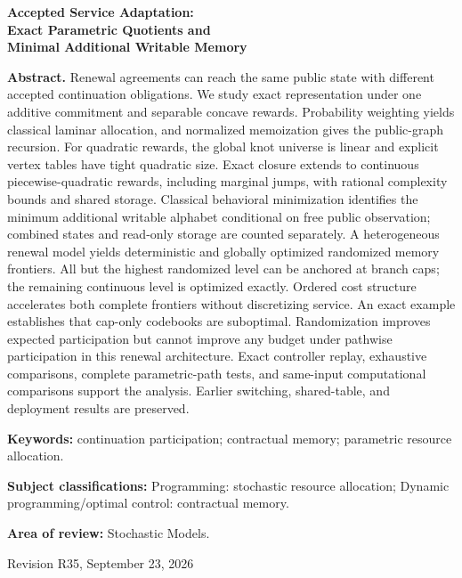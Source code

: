 \documentclass[11pt,letterpaper]{article}
\theoremstyle{definition}\newtheorem{assumption}[theorem]{Assumption}
\begin{document}
\hypersetup{pageanchor=false}
\begin{titlepage}\centering
{\Large\bfseries Accepted Service Adaptation:\\ Exact Parametric Quotients and\\ Minimal Additional Writable Memory\par}
\vspace{.35in}{Anonymous manuscript for Operations Research\par}\vspace{.25in}
\begin{minipage}{\textwidth}
\textbf{Abstract.} Renewal agreements can reach the same public state with different accepted continuation obligations. We study exact representation under one additive commitment and separable concave rewards. Probability weighting yields classical laminar allocation, and normalized memoization gives the public-graph recursion. For quadratic rewards, the global knot universe is linear and explicit vertex tables have tight quadratic size. Exact closure extends to continuous piecewise-quadratic rewards, including marginal jumps, with rational complexity bounds and shared storage. Classical behavioral minimization identifies the minimum additional writable alphabet conditional on free public observation; combined states and read-only storage are counted separately. A heterogeneous renewal model yields deterministic and globally optimized randomized memory frontiers. All but the highest randomized level can be anchored at branch caps; the remaining continuous level is optimized exactly. Ordered cost structure accelerates both complete frontiers without discretizing service. An exact example establishes that cap-only codebooks are suboptimal. Randomization improves expected participation but cannot improve any budget under pathwise participation in this renewal architecture. Exact controller replay, exhaustive comparisons, complete parametric-path tests, and same-input computational comparisons support the analysis. Earlier switching, shared-table, and deployment results are preserved.
\par\vspace{.15in}\textbf{Keywords:} continuation participation; contractual memory; parametric resource allocation.
\par\vspace{.1in}\textbf{Subject classifications:} Programming: stochastic resource allocation; Dynamic programming/optimal control: contractual memory.
\par\vspace{.1in}\textbf{Area of review:} Stochastic Models.
\end{minipage}\vfill{Revision R35, September 23, 2026\par}
\end{titlepage}
\end{document}
